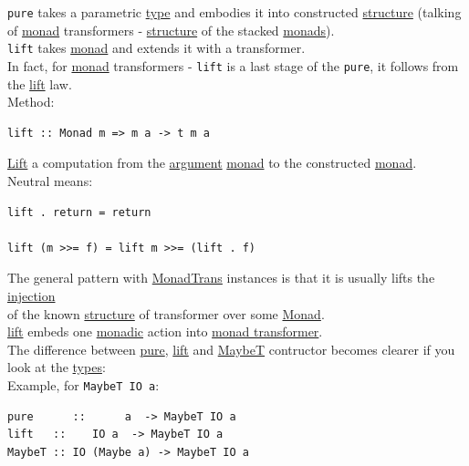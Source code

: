 \documentclass[a4paper,14pt,oneside]{book}
\begin{document}
{\texttt{pure} takes a parametric \hyperref[orga9ca243]{type} and embodies it into constructed \hyperref[org080800e]{structure} (talking of \hyperref[org90c21ab]{monad} transformers - \hyperref[org080800e]{structure} of the stacked \hyperref[org7e5e6f7]{monads}).\\

\texttt{lift} takes \hyperref[org90c21ab]{monad} and extends it with a transformer.\\

In fact, for \hyperref[org90c21ab]{monad} transformers - \texttt{lift} is a last stage of the \texttt{pure}, it follows from the \hyperref[orga582c5d]{lift} law.\\

Method:\\
\begin{verbatim}
lift :: Monad m => m a -> t m a
\end{verbatim}
\hyperref[orga582c5d]{Lift} a computation from the \hyperref[orgdd12744]{argument} \hyperref[org90c21ab]{monad} to the constructed \hyperref[org90c21ab]{monad}.\\

Neutral means:\\
\begin{verbatim}
lift . return = return

lift (m >>= f) = lift m >>= (lift . f)
\end{verbatim}

The general pattern with \hyperref[orgbc4eda7]{MonadTrans} instances is that it is usually lifts the \hyperref[org1ed8a05]{injection}\\
of the known \hyperref[org080800e]{structure} of transformer over some \hyperref[org90c21ab]{Monad}.\\

\hyperref[orga582c5d]{lift} embeds one \hyperref[orgbea0cab]{monadic} action into \hyperref[orgaf78a14]{monad transformer}.\\

The difference between \hyperref[org1ebaedd]{pure}, \hyperref[orga582c5d]{lift} and \hyperref[orge64d126]{MaybeT} contructor becomes clearer if you look at the \hyperref[org51532d9]{types}:\\

Example, for \texttt{MaybeT IO a}:\\
\begin{verbatim}
pure      ::      a  -> MaybeT IO a
lift   ::    IO a  -> MaybeT IO a
MaybeT :: IO (Maybe a) -> MaybeT IO a


\end{verbatim}}
\end{document}
